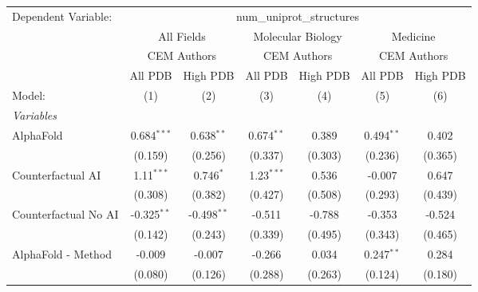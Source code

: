 \begingroup
\centering
\begin{tabular}{lcccccc}
   \tabularnewline \midrule \midrule
   Dependent Variable: & \multicolumn{6}{c}{num\_uniprot\_structures}\\
 & \multicolumn{2}{c}{All Fields} & \multicolumn{2}{c}{Molecular Biology} & \multicolumn{2}{c}{Medicine} \\
\cmidrule(lr){2-3} \cmidrule(lr){4-5} \cmidrule(lr){6-7}
 & \multicolumn{2}{c}{CEM Authors} & \multicolumn{2}{c}{CEM Authors} & \multicolumn{2}{c}{CEM Authors} \\
\cmidrule(lr){2-3} \cmidrule(lr){4-5} \cmidrule(lr){6-7}
 & \multicolumn{1}{c}{All PDB} & \multicolumn{1}{c}{High PDB} & \multicolumn{1}{c}{All PDB} & \multicolumn{1}{c}{High PDB} & \multicolumn{1}{c}{All PDB} & \multicolumn{1}{c}{High PDB} \\
\cmidrule(lr){2-2} \cmidrule(lr){3-3} \cmidrule(lr){4-4} \cmidrule(lr){5-5} \cmidrule(lr){6-6} \cmidrule(lr){7-7}
   Model:                                                     & (1)           & (2)           & (3)          & (4)     & (5)            & (6)\\  
   \midrule
   \emph{Variables}\\
   AlphaFold                                                  & 0.684$^{***}$ & 0.638$^{**}$  & 0.674$^{**}$ & 0.389   & 0.494$^{**}$   & 0.402\\   
                                                              & (0.159)       & (0.256)       & (0.337)      & (0.303) & (0.236)        & (0.365)\\   
   Counterfactual AI                                          & 1.11$^{***}$  & 0.746$^{*}$   & 1.23$^{***}$ & 0.536   & -0.007         & 0.647\\   
                                                              & (0.308)       & (0.382)       & (0.427)      & (0.508) & (0.293)        & (0.439)\\   
   Counterfactual No AI                                       & -0.325$^{**}$ & -0.498$^{**}$ & -0.511       & -0.788  & -0.353         & -0.524\\   
                                                              & (0.142)       & (0.243)       & (0.339)      & (0.495) & (0.343)        & (0.465)\\   
   AlphaFold - Method                                         & -0.009        & -0.007        & -0.266       & 0.034   & 0.247$^{**}$   & 0.284\\   
                                                              & (0.080)       & (0.126)       & (0.288)      & (0.263) & (0.124)        & (0.180)\\   

\end{tabular}
